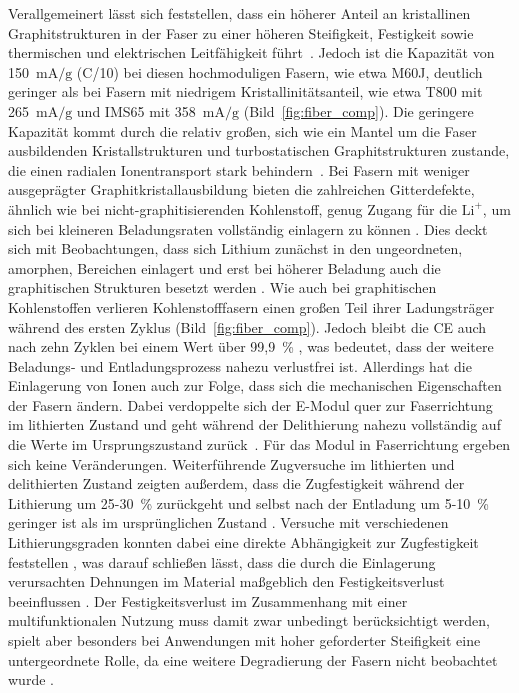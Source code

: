 Verallgemeinert lässt sich feststellen, dass ein höherer Anteil an kristallinen Graphitstrukturen in der Faser zu einer höheren Steifigkeit, Festigkeit sowie thermischen und elektrischen Leitfähigkeit führt~\cite{Zenkert2024}. Jedoch ist die Kapazität von 150~$\si{\mA\per\g}$ (C/10) bei diesen hochmoduligen Fasern, wie etwa M60J, deutlich geringer als bei Fasern mit niedrigem Kristallinitätsanteil, wie etwa T800 mit 265~$\si{\mA\per\g}$ und IMS65 mit 358~$\si{\mA\per\g}$ \cite{Fredi2018} (Bild~\ref{fig:fiber_comp}). Die geringere Kapazität kommt durch die relativ großen, sich wie ein Mantel um die Faser ausbildenden Kristallstrukturen und turbostatischen Graphitstrukturen zustande, die einen radialen Ionentransport stark behindern~\cite{Zenkert2024,He2021}. Bei Fasern mit weniger ausgeprägter Graphitkristallausbildung bieten die zahlreichen Gitterdefekte, ähnlich wie bei nicht-graphitisierenden Kohlenstoff, genug Zugang für die $\text{Li}^{+}$, um sich bei kleineren Beladungsraten vollständig einlagern zu können \cite{Fredi2018}. Dies deckt sich mit Beobachtungen, dass sich Lithium zunächst in den ungeordneten, amorphen, Bereichen einlagert und erst bei höherer Beladung auch die graphitischen Strukturen besetzt werden \cite{Fang2022}. Wie auch bei graphitischen Kohlenstoffen verlieren Kohlenstofffasern einen großen Teil ihrer Ladungsträger während des ersten Zyklus \cite{Jacques2013} (Bild~\ref{fig:fiber_comp}). Jedoch bleibt die CE auch nach zehn Zyklen bei einem Wert über 99,9~\% \cite{Hagberg2016}, was bedeutet, dass der weitere Beladungs- und Entladungsprozess nahezu verlustfrei ist. Allerdings hat die Einlagerung von Ionen auch zur Folge, dass sich die mechanischen Eigenschaften der Fasern ändern. Dabei verdoppelte sich der E-Modul quer zur Faserrichtung im lithierten Zustand und geht während der Delithierung nahezu vollständig auf die Werte im Ursprungszustand zurück~\cite{Duan2021}. Für das Modul in Faserrichtung ergeben sich keine Veränderungen. Weiterführende Zugversuche im lithierten und delithierten Zustand zeigten außerdem, dass die Zugfestigkeit während der Lithierung um 25-30~\% zurückgeht und selbst nach der Entladung um 5-10~\% geringer ist als im ursprünglichen Zustand \cite{Jacques2012}. Versuche mit verschiedenen Lithierungsgraden konnten dabei eine direkte Abhängigkeit zur Zugfestigkeit feststellen \cite{Jacques2014}, was darauf schließen lässt, dass die durch die Einlagerung verursachten Dehnungen im Material maßgeblich den Festigkeitsverlust beeinflussen \cite{Zenkert2024}. Der Festigkeitsverlust im Zusammenhang mit einer multifunktionalen Nutzung muss damit zwar unbedingt berücksichtigt werden, spielt aber besonders bei Anwendungen mit hoher geforderter Steifigkeit eine untergeordnete Rolle, da eine weitere Degradierung der Fasern nicht beobachtet wurde \cite{Zenkert2024}.

